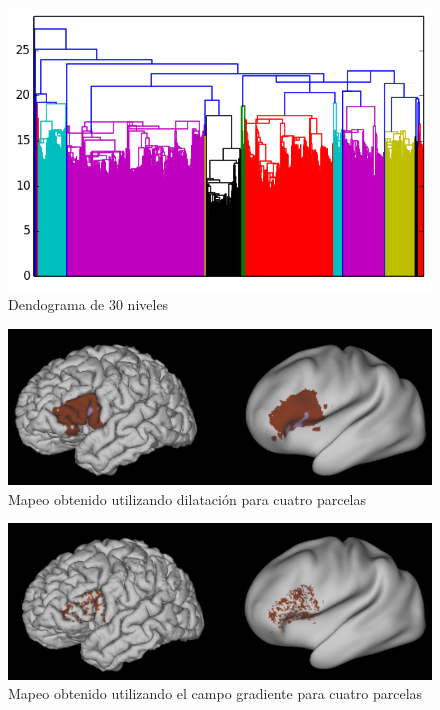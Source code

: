 \begin{figure}[h!]
   \centering
    \includegraphics[width=\textwidth]{img/dendo2.png}
    \caption{Dendograma de 30 niveles}
    \label{fig:infla}
\end{figure}

\begin{figure}[h!]
   \centering
    \includegraphics[width=\textwidth]{img/inflated.png}
    \caption{Mapeo obtenido utilizando dilataci\'on para cuatro parcelas}
    \label{fig:infla}
\end{figure}

\begin{figure}[h!]
   \centering
    \includegraphics[width=\textwidth]{img/reconstructed.png}
    \caption{Mapeo obtenido utilizando el campo gradiente para cuatro parcelas}
    \label{fig:rec}
\end{figure}

